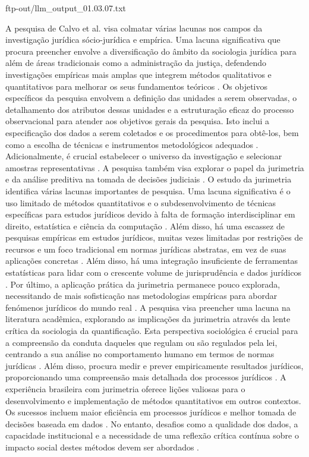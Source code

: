 ftp-out/llm_output_01.03.07.txt 

A pesquisa de Calvo et al. visa colmatar várias lacunas nos campos da investigação jurídica sócio-jurídica e empírica. Uma lacuna significativa que procura preencher envolve a diversificação do âmbito da sociologia jurídica para além de áreas tradicionais como a administração da justiça, defendendo investigações empíricas mais amplas que integrem métodos qualitativos e quantitativos para melhorar os seus fundamentos teóricos \cite{calvo2024}. Os objetivos específicos da pesquisa envolvem a definição das unidades a serem observadas, o detalhamento dos atributos dessas unidades e a estruturação eficaz do processo observacional para atender aos objetivos gerais da pesquisa. Isto inclui a especificação dos dados a serem coletados e os procedimentos para obtê-los, bem como a escolha de técnicas e instrumentos metodológicos adequados \cite{calvo2024}. Adicionalmente, é crucial estabelecer o universo da investigação e selecionar amostras representativas \cite{calvo2024}. A pesquisa também visa explorar o papel da jurimetria e da análise preditiva na tomada de decisões judiciais \cite{calvo2024}. O estudo da jurimetria identifica várias lacunas importantes de pesquisa. Uma lacuna significativa é o uso limitado de métodos quantitativos e o subdesenvolvimento de técnicas específicas para estudos jurídicos devido à falta de formação interdisciplinar em direito, estatística e ciência da computação \cite{nunes2018,nunes2018}. Além disso, há uma escassez de pesquisas empíricas em estudos jurídicos, muitas vezes limitadas por restrições de recursos e um foco tradicional em normas jurídicas abstratas, em vez de suas aplicações concretas \cite{nunes2018}. Além disso, há uma integração insuficiente de ferramentas estatísticas para lidar com o crescente volume de jurisprudência e dados jurídicos \cite{de2010}. Por último, a aplicação prática da jurimetria permanece pouco explorada, necessitando de mais sofisticação nas metodologias empíricas para abordar fenómenos jurídicos do mundo real \cite{massuanganhe2016}. A pesquisa visa preencher uma lacuna na literatura acadêmica, explorando as implicações da jurimetria através da lente crítica da sociologia da quantificação. Esta perspectiva sociológica é crucial para a compreensão da conduta daqueles que regulam ou são regulados pela lei, centrando a sua análise no comportamento humano em termos de normas jurídicas \cite{101111lsi12334}. Além disso, procura medir e prever empiricamente resultados jurídicos, proporcionando uma compreensão mais detalhada dos processos jurídicos \cite{101111lsi12334}. A experiência brasileira com jurimetria oferece lições valiosas para o desenvolvimento e implementação de métodos quantitativos em outros contextos. Os sucessos incluem maior eficiência em processos jurídicos e melhor tomada de decisões baseada em dados \cite{10.1007/s11186-021-09453-1}. No entanto, desafios como a qualidade dos dados, a capacidade institucional e a necessidade de uma reflexão crítica contínua sobre o impacto social destes métodos devem ser abordados \cite{10.1007/s11186-021-09453-1}. 

